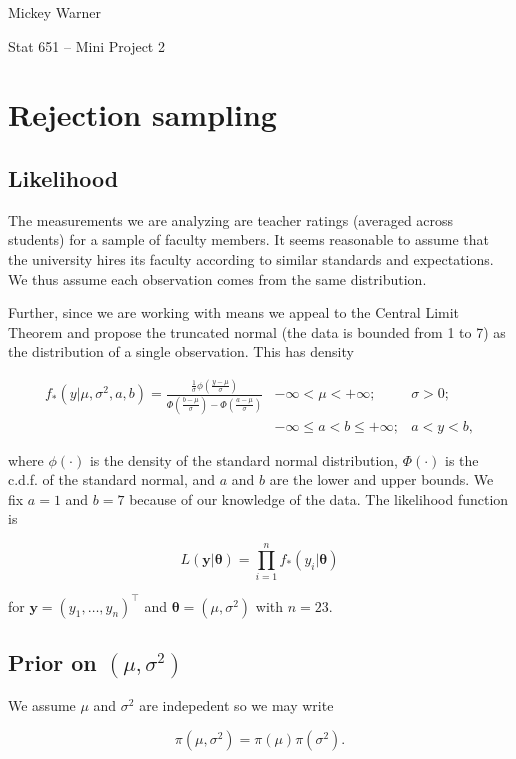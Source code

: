 \documentclass[12pt]{article}
\newcommand{\m}[1]{\mathbf{\bm{#1}}}
\begin{document}
\noindent Mickey Warner

\noindent Stat 651 -- Mini Project 2

\section{Rejection sampling}

\subsection{Likelihood}

\noindent The measurements we are analyzing are teacher ratings (averaged across students) for a sample of faculty members. It seems reasonable to assume that the university hires its faculty according to similar standards and expectations. We thus assume each observation comes from the same distribution.
\bigskip

\noindent Further, since we are working with means we appeal to the Central Limit Theorem and propose the truncated normal (the data is bounded from 1 to 7) as the distribution of a single observation. This has density

\begin{eqnarray*}
f_*(y|\mu,\sigma^2,a,b) = \frac{\frac{1}{\sigma}\phi(\frac{y-\mu}{\sigma})}{\Phi(\frac{b-\mu}{\sigma})-\Phi(\frac{a-\mu}{\sigma})} & -\infty < \mu < +\infty; & \sigma > 0; \\
& -\infty \leq a < b \leq +\infty; & a < y < b,
\end{eqnarray*}

\noindent where $\phi(\cdot)$ is the density of the standard normal distribution, $\Phi(\cdot)$ is the c.d.f. of the standard normal, and $a$ and $b$ are the lower and upper bounds. We fix $a=1$ and $b=7$ because of our knowledge of the data. The likelihood function is

\[L(\m{y}|\m{\theta}) = \prod_{i=1}^n f_*(y_i|\m{\theta}) \]

\noindent for $\m{y}=(y_1,\ldots,y_n)^\top$ and $\m{\theta}=(\mu, \sigma^2)$ with $n=23$.

\subsection{Prior on $(\mu, \sigma^2)$}

\noindent We assume $\mu$ and $\sigma^2$ are indepedent so we may write

\[ \pi(\mu, \sigma^2) = \pi(\mu)\pi(\sigma^2). \]
\end{document}
